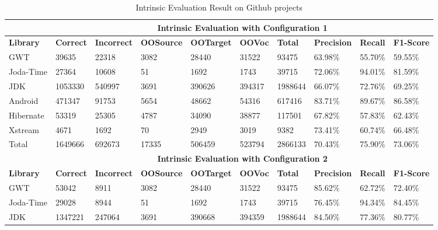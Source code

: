   \begin{table*}[t]
  \tiny
  \centering
  \caption{Intrinsic Evaluation Result on Github projects}
\begin{tabular}{|l|l|l|l|l|l|l|l|l|l|}
\hline
          &  \multicolumn{9}{c|}{\textbf{Intrinsic Evaluation with Configuration 1}}           \\
\hline
\textbf{Library}   & \textbf{Correct} & \textbf{Incorrect} & \textbf{OOSource} & \textbf{OOTarget} & \textbf{OOVoc}  & \textbf{Total}   & \textbf{Precision} & \textbf{Recall}  & \textbf{F1-Score} \\ \hline
GWT       & 39635   & 22318     & 3082     & 28440    & 31522  & 93475   & 63.98\%   & 55.70\% & 59.55\%  \\ \hline
Joda-Time & 27364   & 10608     & 51       & 1692     & 1743   & 39715   & 72.06\%   & 94.01\% & 81.59\%  \\ \hline
JDK       & 1053330 & 540997    & 3691     & 390626   & 394317 & 1988644 & 66.07\%   & 72.76\% & 69.25\%  \\ \hline
Android   & 471347  & 91753     & 5654     & 48662    & 54316  & 617416  & 83.71\%   & 89.67\% & 86.58\%  \\ \hline
Hibernate & 53319   & 25305     & 4787     & 34090    & 38877  & 117501  & 67.82\%   & 57.83\% & 62.43\%  \\ \hline
Xstream   & 4671    & 1692      & 70       & 2949     & 3019   & 9382    & 73.41\%   & 60.74\% & 66.48\%  \\ \hline
Total     & 1649666 & 692673    & 17335    & 506459   & 523794 & 2866133 & 70.43\%   & 75.90\% & 73.06\%  \\ \hline
          & \multicolumn{9}{c|}{\textbf{Intrinsic Evaluation with Configuration 2}} \\
\hline
\textbf{Library}   & \textbf{Correct} & \textbf{Incorrect} & \textbf{OOSource} & \textbf{OOTarget} & \textbf{OOVoc}  & \textbf{Total}   & \textbf{Precision} & \textbf{Recall}  & \textbf{F1-Score} \\ \hline
GWT       & 53042                                     & 8911      & 3082     & 28440    & 31522  & 93475   & 85.62\%   & 62.72\% & 72.40\%  \\ \hline
Joda-Time & 29028                                     & 8944      & 51       & 1692     & 1743   & 39715   & 76.45\%   & 94.34\% & 84.45\%  \\
\hline
JDK       & 1347221                                   & 247064    & 3691     & 390668   & 394359 & 1988644 & 84.50\%   & 77.36\% & 80.77\%  \\

\end{tabular}
\end{table*}
